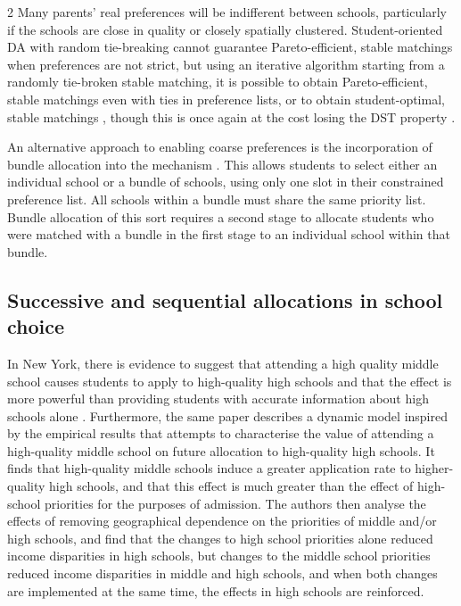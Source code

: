 \documentclass{article}
\begin{document}
\begin{multicols}{2}
Many parents' real preferences will be indifferent between schools, particularly if the schools are close in quality or closely spatially clustered. Student-oriented DA with random tie-breaking cannot guarantee Pareto-efficient, stable matchings when preferences are not strict, but using an iterative algorithm starting from a randomly tie-broken stable matching, it is possible to obtain Pareto-efficient, stable matchings even with ties in preference lists, or to obtain student-optimal, stable matchings \cite{erdilTwosidedMatchingIndifferences2017}, though this is once again at the cost losing the DST property \cite{rothEconomicsMatchingStability1982}.

An alternative approach to enabling coarse preferences is the incorporation of bundle allocation into the mechanism \cite{huangBundledSchoolChoice2025}. This allows students to select either an individual school or a bundle of schools, using only one slot in their constrained preference list. All schools within a bundle must share the same priority list. Bundle allocation of this sort requires a second stage to allocate students who were matched with a bundle in the first stage to an individual school within that bundle.

\subsection{Successive and sequential allocations in school choice}
In New York, there is evidence to suggest that attending a high quality middle school causes students to apply to high-quality high schools and that the effect is more powerful than providing students with accurate information about high schools alone \cite{hahmDynamicFrameworkSchool}. Furthermore, the same paper describes a dynamic model inspired by the empirical results that attempts to characterise the value of attending a high-quality middle school on future allocation to high-quality high schools. It finds that high-quality middle schools induce a greater application rate to higher-quality high schools, and that this effect is much greater than the effect of high-school priorities for the purposes of admission. The authors then analyse the effects of removing geographical dependence on the priorities of middle and/or high schools, and find that the changes to high school priorities alone reduced income disparities in high schools, but changes to the middle school priorities reduced income disparities in middle and high schools, and when both changes are implemented at the same time, the effects in high schools are reinforced.


\end{multicols}
\end{document}
